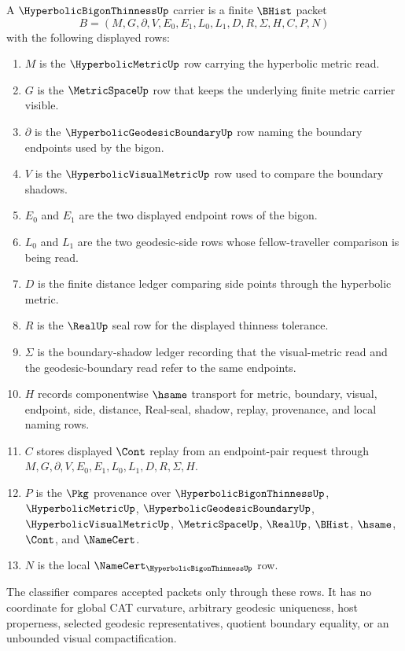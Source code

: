 \begin{definition}\label{def:hyperbolic-bigon-thinness-carrier}
A $\HyperbolicBigonThinnessUp$ carrier is a finite $\BHist$ packet
$$
B=(M,G,\partial,V,E_0,E_1,L_0,L_1,D,R,\Sigma,H,C,P,N)
$$
with the following displayed rows:
\begin{enumerate}
\item $M$ is the $\HyperbolicMetricUp$ row carrying the hyperbolic metric read.
\item $G$ is the $\MetricSpaceUp$ row that keeps the underlying finite metric carrier visible.
\item $\partial$ is the $\HyperbolicGeodesicBoundaryUp$ row naming the boundary endpoints used by the bigon.
\item $V$ is the $\HyperbolicVisualMetricUp$ row used to compare the boundary shadows.
\item $E_0$ and $E_1$ are the two displayed endpoint rows of the bigon.
\item $L_0$ and $L_1$ are the two geodesic-side rows whose fellow-traveller comparison is being read.
\item $D$ is the finite distance ledger comparing side points through the hyperbolic metric.
\item $R$ is the $\RealUp$ seal row for the displayed thinness tolerance.
\item $\Sigma$ is the boundary-shadow ledger recording that the visual-metric read and the geodesic-boundary read refer to the same endpoints.
\item $H$ records componentwise $\hsame$ transport for metric, boundary, visual, endpoint, side, distance, Real-seal, shadow, replay, provenance, and local naming rows.
\item $C$ stores displayed $\Cont$ replay from an endpoint-pair request through $M,G,\partial,V,E_0,E_1,L_0,L_1,D,R,\Sigma,H$.
\item $P$ is the $\Pkg$ provenance over $\HyperbolicBigonThinnessUp$, $\HyperbolicMetricUp$, $\HyperbolicGeodesicBoundaryUp$, $\HyperbolicVisualMetricUp$, $\MetricSpaceUp$, $\RealUp$, $\BHist$, $\hsame$, $\Cont$, and $\NameCert$.
\item $N$ is the local $\NameCert_{\HyperbolicBigonThinnessUp}$ row.
\end{enumerate}
The classifier compares accepted packets only through these rows. It has no coordinate for global CAT curvature, arbitrary geodesic uniqueness, host properness, selected geodesic representatives, quotient boundary equality, or an unbounded visual compactification.
\end{definition}

